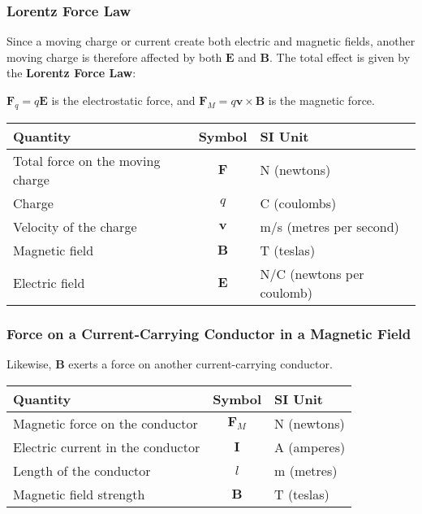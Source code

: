 \documentclass[12pt,aspectratio=169]{beamer}
\newcommand{\mb}[1]{\mathbf{#1}}
\newcommand{\eq}[2]{\vspace{#1}{\Large\begin{displaymath}#2\end{displaymath}}}
\begin{document}
\begin{frame}
  \frametitle{Lorentz Force Law}
  Since a moving charge or current create both electric and magnetic fields,
  another moving charge is therefore affected by both $\mb{E}$ and $\mb{B}$.
  The total effect is given by the \textbf{Lorentz Force Law}:

  \eq{-.2in}{
    \boxed{\mb{F}=q(\mb{E}+\mb{v}\times\mb{B})}
  }

  \vspace{-.1in}$\mb{F}_q=q\mb{E}$ is the electrostatic force, and
  $\mb{F}_M=q\mb{v}\times\mb{B}$ is the magnetic force.

  \vspace{-.15in}
  \begin{center}
    \begin{tabular}{l|c|l}
      \rowcolor{pink}
      \textbf{Quantity} & \textbf{Symbol} & \textbf{SI Unit} \\ \hline
      Total force on the moving charge & $\mb{F}$ & \si{N} (newtons) \\
      Charge                 & $q$      & \si{C}   (coulombs) \\
      Velocity of the charge & $\mb{v}$ & \si{m/s} (metres per second)\\
      Magnetic field         & $\mb{B}$ & \si{T}   (teslas) \\
      Electric field         & $\mb{E}$ & \si{N/C} (newtons per coulomb)
    \end{tabular}
  \end{center}

\end{frame}


\begin{frame}
  \frametitle{Force on a Current-Carrying Conductor in a Magnetic Field}

  Likewise, $\mb{B}$ exerts a force on another current-carrying conductor.

  \eq{-.2in}{
    \boxed{F_M=\mb{I}l\times\mb{B}}
  }
  
  \vspace{-.1in}
  \begin{center}
    \begin{tabular}{l|c|l}
      \rowcolor{pink}
      \textbf{Quantity} & \textbf{Symbol} & \textbf{SI Unit} \\ \hline
      Magnetic force on the conductor   & $\mb{F}_M$ & \si{N} (newtons) \\
      Electric current in the conductor & $\mb{I}$   & \si{A} (amperes) \\
      Length of the conductor           & $l$        & \si{m} (metres)\\
      Magnetic field strength           & $\mb{B}$   & \si{T} (teslas)
    \end{tabular}
  \end{center}
\end{frame}
\end{document}
